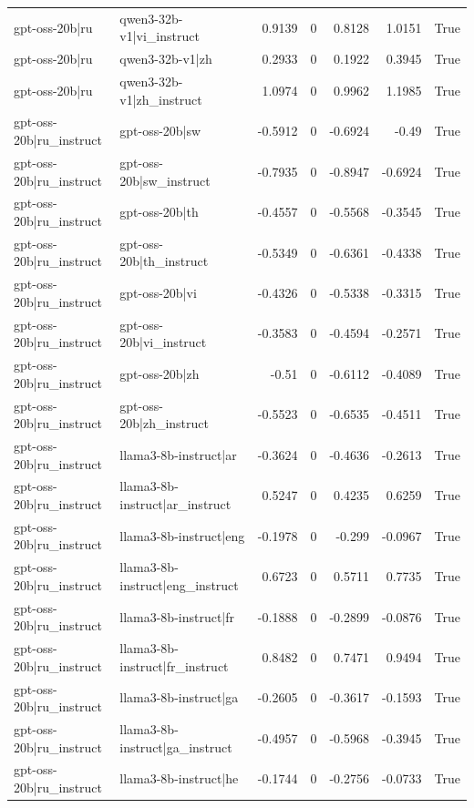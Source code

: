 \begin{table}
\begin{tabular}{l l r r r r l}
gpt-oss-20b|ru & qwen3-32b-v1|vi_instruct & 0.9139 & 0 & 0.8128 & 1.0151 & True \\
gpt-oss-20b|ru & qwen3-32b-v1|zh & 0.2933 & 0 & 0.1922 & 0.3945 & True \\
gpt-oss-20b|ru & qwen3-32b-v1|zh_instruct & 1.0974 & 0 & 0.9962 & 1.1985 & True \\
gpt-oss-20b|ru_instruct & gpt-oss-20b|sw & -0.5912 & 0 & -0.6924 & -0.49 & True \\
gpt-oss-20b|ru_instruct & gpt-oss-20b|sw_instruct & -0.7935 & 0 & -0.8947 & -0.6924 & True \\
gpt-oss-20b|ru_instruct & gpt-oss-20b|th & -0.4557 & 0 & -0.5568 & -0.3545 & True \\
gpt-oss-20b|ru_instruct & gpt-oss-20b|th_instruct & -0.5349 & 0 & -0.6361 & -0.4338 & True \\
gpt-oss-20b|ru_instruct & gpt-oss-20b|vi & -0.4326 & 0 & -0.5338 & -0.3315 & True \\
gpt-oss-20b|ru_instruct & gpt-oss-20b|vi_instruct & -0.3583 & 0 & -0.4594 & -0.2571 & True \\
gpt-oss-20b|ru_instruct & gpt-oss-20b|zh & -0.51 & 0 & -0.6112 & -0.4089 & True \\
gpt-oss-20b|ru_instruct & gpt-oss-20b|zh_instruct & -0.5523 & 0 & -0.6535 & -0.4511 & True \\
gpt-oss-20b|ru_instruct & llama3-8b-instruct|ar & -0.3624 & 0 & -0.4636 & -0.2613 & True \\
gpt-oss-20b|ru_instruct & llama3-8b-instruct|ar_instruct & 0.5247 & 0 & 0.4235 & 0.6259 & True \\
gpt-oss-20b|ru_instruct & llama3-8b-instruct|eng & -0.1978 & 0 & -0.299 & -0.0967 & True \\
gpt-oss-20b|ru_instruct & llama3-8b-instruct|eng_instruct & 0.6723 & 0 & 0.5711 & 0.7735 & True \\
gpt-oss-20b|ru_instruct & llama3-8b-instruct|fr & -0.1888 & 0 & -0.2899 & -0.0876 & True \\
gpt-oss-20b|ru_instruct & llama3-8b-instruct|fr_instruct & 0.8482 & 0 & 0.7471 & 0.9494 & True \\
gpt-oss-20b|ru_instruct & llama3-8b-instruct|ga & -0.2605 & 0 & -0.3617 & -0.1593 & True \\
gpt-oss-20b|ru_instruct & llama3-8b-instruct|ga_instruct & -0.4957 & 0 & -0.5968 & -0.3945 & True \\
gpt-oss-20b|ru_instruct & llama3-8b-instruct|he & -0.1744 & 0 & -0.2756 & -0.0733 & True \\

\end{tabular}
\end{table}
